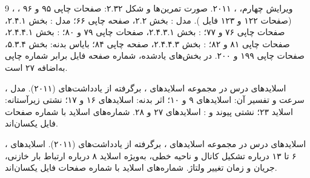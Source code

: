 \documentclass[12pt,a4paper]{article}
\newcommand{\exnum}[1]{\mbox{\beginL#1\endL}}
\begin{document}
\MakeAssignmentCover







\clearpage
\begin{thebibliography}{9}
،
،
ویرایش چهارم، ، ۲۰۱۱.
صورت تمرین‌ها و شکل \exnum{۲.۳۲}: صفحات چاپی ۹۵ و ۹۶
(صفحات ۱۲۲ و ۱۲۳ فایل ).
مدل : بخش \exnum{۲.۲}، صفحه چاپی ۶۶؛
مدل : بخش \exnum{۲.۴.۱}، صفحات چاپی ۷۶ و ۷۷؛
: بخش \exnum{۲.۴.۳.۱}، صفحات چاپی ۷۹ و ۸۰؛
: بخش \exnum{۲.۴.۴.۱}، صفحات چاپی ۸۱ و ۸۲؛
: بخش \exnum{۲.۴.۴.۳}، صفحه چاپی ۸۴؛
بایاس بدنه: بخش \exnum{۵.۳.۴}، صفحات چاپی ۱۹۹ و ۲۰۰.
در بخش‌های یادشده، شماره صفحه فایل برابر شماره چاپی به‌اضافه ۲۷ است.

، اسلایدهای درس در مجموعه اسلایدهای
، برگرفته از یادداشت‌های
 (۲۰۱۱).
مدل سرعت و تفسیر آن: اسلایدهای ۹ و ۱۰؛ اثر بدنه: اسلایدهای ۱۶ و ۱۷؛
نشتی زیرآستانه: اسلاید ۲۳؛ نشتی پیوند و : اسلایدهای ۲۷ و ۲۸.
شماره‌های اسلاید با شماره صفحات فایل یکسان‌اند.

، اسلایدهای درس در مجموعه اسلایدهای
، برگرفته از یادداشت‌های
 (۲۰۱۱).
اسلایدهای ۶ تا ۱۳ درباره تشکیل کانال و ناحیه خطی،
به‌ویژه اسلاید ۸ درباره ارتباط بار خازنی، جریان و زمان تغییر ولتاژ.
شماره‌های اسلاید با شماره صفحات فایل یکسان‌اند.
\end{thebibliography}
\end{document}
